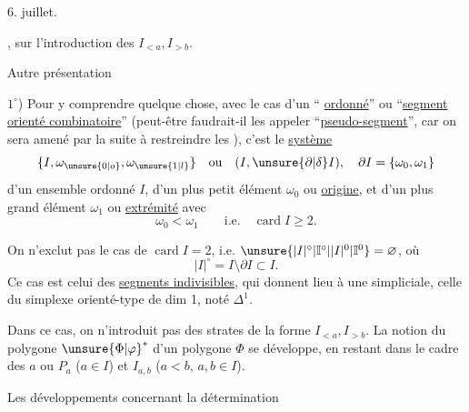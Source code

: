 6. juillet.

, sur l'introduction des $I_{<a},I_{>b}$.

Autre présentation

$1^\circ$) Pour y comprendre quelque chose,  avec le cas d'un `` \uline{ordonné}'' ou ``\uline{segment orienté combinatoire}'' (peut-être faudrait-il les appeler ``\uline{pseudo-segment}'', car on sera amené par la suite à restreindre les ), c'est le \uline{système}
\[
\{I,\omega_{\unsure{0|o}},\omega_{\unsure{1|l}}\}\quad\text{ou}\quad(I,\unsure{\partial|\delta}I),\quad\partial I=\{\omega_0,\omega_1\}
\]
d'un ensemble ordonné $I$, d'un plus petit élément $\omega_0$ ou \uline{origine}, et d'un plus grand élément $\omega_1$ ou \uline{extrémité} avec
\[
\omega_0<\omega_1\qquad\text{i.e.}\quad\operatorname{card}I\geq2.
\]

On n'exclut pas le cas de $\operatorname{card}I=2$, i.e. $\unsure{\lvert I\rvert^{\circ}|\mathbb I^{\circ}|\lvert I\rvert^0|\mathbb I^0}=\varnothing$, où
\[
\lvert I\rvert^{\circ}=I\setminus\partial I\subset I.
\]
Ce cas est celui des \uline{segments indivisibles}, qui donnent lieu à une     simpliciale,  celle du simplexe orienté-type de dim 1, noté $\Delta^1$.

Dans ce cas, on n'introduit pas des strates de la forme $I_{<a},I_{>b}$. La notion du polygone  ${\unsure{\Phi|\varphi}}^*$ d'un polygone $\Phi$ se développe, en restant dans le cadre des $a$ ou $P_a$ ($a\in I$) et $I_{a,b}$ ($a<b$, $a,b\in I$).

Les développements concernant la détermination
